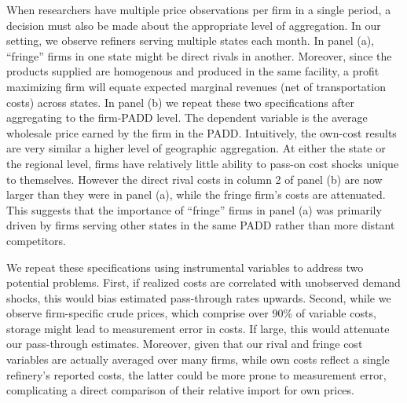 \documentclass[12pt]{article}
\begin{document}
When researchers have multiple price observations per firm in a single period, a decision must also be made about the appropriate level of aggregation. In our setting, we observe refiners serving multiple states each month. In panel (a), ``fringe'' firms in one state might be direct rivals in another. Moreover, since the products supplied are homogenous and produced in the same facility, a profit maximizing firm will equate expected marginal revenues (net of transportation costs) across states. In panel (b) we repeat these two specifications after aggregating to the firm-PADD level. The dependent variable is the average wholesale price earned by the firm in the PADD. Intuitively, the own-cost results are very similar a higher level of geographic aggregation. At either the state or the regional level, firms have relatively little ability to pass-on cost shocks unique to themselves.  However the direct rival costs in column 2 of panel (b) are now larger than they were in panel (a), while the fringe firm's costs are attenuated. This suggests that the importance of ``fringe'' firms in panel (a) was primarily driven by firms serving other states in the same PADD rather than more distant competitors.

We repeat these specifications using instrumental variables to address two potential problems.  First, if realized costs are correlated with unobserved demand shocks, this would bias estimated pass-through rates upwards.  Second, while we observe firm-specific crude prices, which comprise over 90\% of variable costs, storage might lead to measurement error in costs. If large, this would attenuate our pass-through estimates. Moreover, given that our rival and fringe cost variables are actually averaged over many firms, while own costs reflect a single refinery's reported costs, the latter could be more prone to measurement error, complicating a direct comparison of their relative import for own prices.
\end{document}

